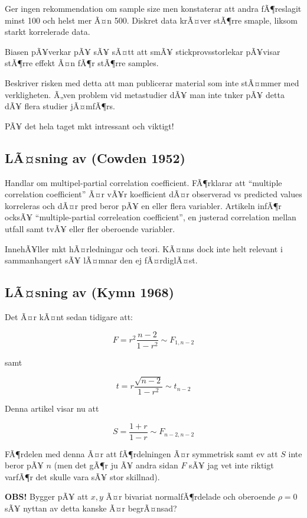 \documentclass[]{article}
\begin{document}
Ger ingen rekommendation om sample size men konstaterar att andra
fÃ¶reslagit minst 100 och helst mer Ã¤n 500. Diskret data krÃ¤ver
stÃ¶rre smaple, liksom starkt korrelerade data.

Biasen pÃ¥verkar pÃ¥ sÃ¥ sÃ¤tt att smÃ¥ stickprovsstorlekar pÃ¥visar
stÃ¶rre effekt Ã¤n fÃ¶r stÃ¶rre samples.

Beskriver risken med detta att man publicerar material som inte stÃ¤mmer
med verkligheten. Ã„ven problem vid metastudier dÃ¥ man inte tnker pÃ¥
detta dÃ¥ flera studier jÃ¤mfÃ¶rs.

PÃ¥ det hela taget mkt intressant och viktigt!

\subsection{LÃ¤sning av (Cowden 1952)}\label{lasning-av-cowden1952}

Handlar om multipel-partial correlation coefficient. FÃ¶rklarar att
``multiple correlation coefficient'' Ã¤r vÃ¥r koefficient dÃ¤r
observerad vs predicted values korreleras och dÃ¤r pred beror pÃ¥ en
eller flera variabler. Artikeln infÃ¶r ocksÃ¥ ``multiple-partial
correleation coefficient'', en justerad correlation mellan utfall samt
tvÃ¥ eller fler oberoende variabler.

InnehÃ¥ller mkt hÃ¤rledningar och teori. KÃ¤nns dock inte helt relevant
i sammanhangert sÃ¥ lÃ¤mnar den ej fÃ¤rdiglÃ¤st.

\subsection{LÃ¤sning av (Kymn 1968)}\label{lasning-av-kymn1968}

Det Ã¤r kÃ¤nt sedan tidigare att:

\[ F = r^2\frac{n-2}{1-r^2} \sim F_{1, n-2} \]

samt

\[ t = r\frac{\sqrt{n-2}}{1-r^2} \sim t_{n-2} \]

Denna artikel visar nu att

\[ S = \frac{1+r}{1-r} \sim F_{n-2, n-2} \]

FÃ¶rdelen med denna Ã¤r att fÃ¶rdelningen Ã¤r symmetrisk samt ev att
\(S\) inte beror pÃ¥ \(n\) (men det gÃ¶r ju Ã¥ andra sidan \(F\) sÃ¥ jag
vet inte riktigt varfÃ¶r det skulle vara sÃ¥ stor skillnad).

\textbf{OBS!} Bygger pÃ¥ att \(x, y\) Ã¤r bivariat normalfÃ¶rdelade och
oberoende \(\rho = 0\) sÃ¥ nyttan av detta kanske Ã¤r begrÃ¤nsad?
\end{document}
